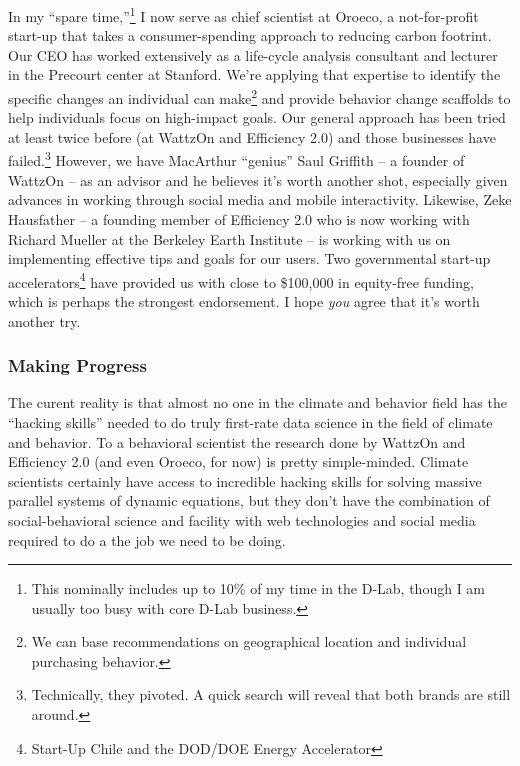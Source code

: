 In my “spare time,”\footnote{This nominally includes up to 10\% of my time in
    the D-Lab, though I am usually too busy with core D-Lab business.} I now
serve as chief scientist at Oroeco, a not-for-profit start-up that takes a
consumer-spending approach to reducing carbon footrint.  Our CEO has worked
extensively as a life-cycle analysis consultant and lecturer in the Precourt
center at Stanford. We're applying that expertise to identify the specific
changes an individual can make\footnote{We can base recommendations on
    geographical location and individual purchasing behavior.} and provide
behavior change scaffolds to help individuals focus on high-impact goals. Our
general approach has been tried at least twice before (at WattzOn and Efficiency
2.0) and those businesses have failed.\footnote{Technically, they pivoted. A
    quick search will reveal that both brands are still around.} However, we
have MacArthur “genius” Saul Griffith -- a founder of WattzOn -- as an advisor
and he believes it's worth another shot, especially given advances in working
through social media and mobile interactivity. Likewise, Zeke Hausfather -- a
founding member of Efficiency 2.0 who is now working with Richard Mueller at the
Berkeley Earth Institute -- is working with us on implementing effective tips
and goals for our users. Two governmental start-up
accelerators\footnote{Start-Up Chile and the DOD/DOE Energy Accelerator} have
provided us with close to \$100,000 in equity-free funding, which is perhaps the
strongest endorsement. I hope \emph{you} agree that it's worth another try.

\subsubsection*{Making Progress}

The curent reality is that almost no one in the climate and behavior field has
the “hacking skills” needed to do truly first-rate data science in the field of
climate and behavior. To a behavioral scientist the research done by WattzOn and
Efficiency 2.0 (and even Oroeco, for now) is pretty simple-minded. Climate
scientists certainly have access to incredible hacking skills for solving
massive parallel systems of dynamic equations, but they don't have the
combination of social-behavioral science and facility with web technologies and
social media required to do a the job we need to be doing.

